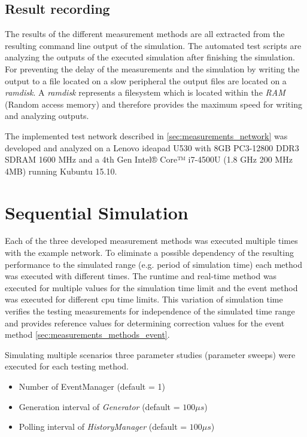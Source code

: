 \subsection{Result recording}
The results of the different measurement methods are all extracted from the resulting command line output of the simulation.
The automated test scripts are analyzing the outputs of the executed simulation after finishing the simulation.
For preventing the delay of the measurements and the simulation by writing the output to a file located on a slow peripheral the output files are located on a \emph{ramdisk}.
A \emph{ramdisk} represents a filesystem which is located within the \emph{RAM} (Random access memory) and therefore provides the maximum speed for writing and analyzing outputs.

The implemented test network described in \ref{sec:measurements_network} was developed and analyzed on a Lenovo ideapad U530 with 8GB PC3-12800 DDR3 SDRAM 1600 MHz and a 4th Gen Intel® Core™ i7-4500U (1.8 GHz 200 MHz 4MB) running Kubuntu 15.10.
\cite{lenovo_spec}

\section{Sequential Simulation}
\label{sec:measurements_sequential}
Each of the three developed measurement methods was executed multiple times with the example network.
To eliminate a possible dependency of the resulting performance to the simulated range (e.g. period of simulation time) each method was executed with different times.
The runtime and real-time method was executed for multiple values for the simulation time limit and the event method was executed for different cpu time limits.
This variation of simulation time verifies the testing measurements for independence of the simulated time range and provides reference values for determining correction values for the event method \ref{sec:measurements_methods_event}.

Simulating multiple scenarios three parameter studies (parameter sweeps) were executed for each testing method.

\begin{itemize}
    \item Number of EventManager (default = 1)
    \item Generation interval of \emph{Generator} (default = $100\mu s$)
    \item Polling interval of \emph{HistoryManager} (default = $100\mu s$)
\end{itemize}

